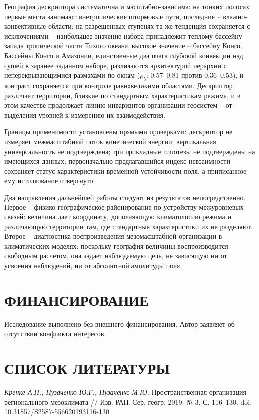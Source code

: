 \documentclass[12pt,a4paper]{article}
\begin{document}
География дескриптора систематична и масштабно-зависима: на тонких полосах первые места занимают внетропические штормовые пути, последние -- влажно-конвективные области; на разрешенных ступенях та же тенденция сохраняется с исключениями -- наибольшее значение набора принадлежит теплому бассейну запада тропической части Тихого океана, высокое значение -- бассейну Конго. Бассейны Конго и Амазонии, единственные два очага глубокой конвекции над сушей в заранее заданном наборе, различаются архитектурой иерархии с неперекрывающимися размахами по окнам ($\rho_5$: 0.57--0.81 против 0.36--0.53), и контраст сохраняется при контроле равновеликими областями. Дескриптор различает территории, близкие по стандартным характеристикам режима, и в этом качестве продолжает линию инвариантов организации геосистем -- от выделения уровней к измерению их взаимодействия.

Границы применимости установлены прямыми проверками: дескриптор не измеряет межмасштабный поток кинетической энергии; вертикальная универсальность не подтверждена; три прикладные гипотезы не подтверждены на имеющихся данных; первоначально предлагавшийся индекс невзаимности сохраняет статус характеристики временной устойчивости поля, а приписанное ему истолкование отвергнуто.

Два направления дальнейшей работы следуют из результатов непосредственно. Первое -- физико-географическое районирование по устройству межуровневых связей: величина дает координату, дополняющую климатологию режима и различающую территории там, где стандартные характеристики их не разделяют. Второе -- диагностика воспроизведения мезомасштабной организации в климатических моделях: поскольку география величины воспроизводится свободным расчетом, она задает наблюдаемую цель, не зависящую ни от усвоения наблюдений, ни от абсолютной амплитуды поля.

\section{ФИНАНСИРОВАНИЕ}

Исследование выполнено без внешнего финансирования. Автор заявляет об отсутствии конфликта интересов.

\clearpage
\section{СПИСОК ЛИТЕРАТУРЫ}

\noindent \textit{Кренке А.Н., Пузаченко Ю.Г., Пузаченко М.Ю.} Пространственная организация регионального мезоклимата // Изв. РАН. Сер. геогр. 2019. № 3. С. 116–130. doi: 10.31857/S2587-556620193116-130
\end{document}
